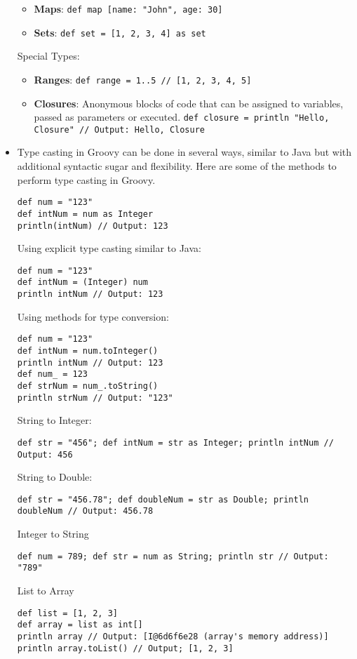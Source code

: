 \documentclass[letterpaper,11pt]{article}
\begin{document}
\begin{itemize}
\begin{itemize}
        \item \textbf{Maps}: \texttt{def map [name: "John", age: 30]}
        \item \textbf{Sets}: \texttt{def set = [1, 2, 3, 4] as set}
    \end{itemize}
Special Types:
    \begin{itemize}
        \item \textbf{Ranges}: \texttt{def range = 1..5 // [1, 2, 3, 4, 5]}
        \item \textbf{Closures}: Anonymous blocks of code that can be assigned to variables, passed as parameters or executed. \texttt{def closure = {println "Hello, Closure"} // Output: Hello, Closure}
    \end{itemize}

    \item Type casting in Groovy can be done in several ways, similar to Java but with additional syntactic sugar and flexibility. Here are some of the methods to perform type casting in Groovy.
    \begin{verbatim}
def num = "123"
def intNum = num as Integer
println(intNum) // Output: 123
    \end{verbatim}
Using explicit type casting similar to Java:
\begin{verbatim}
def num = "123"
def intNum = (Integer) num
println intNum // Output: 123
\end{verbatim}
Using methods for type conversion:
\begin{verbatim}
def num = "123"
def intNum = num.toInteger()
println intNum // Output: 123
def num_ = 123
def strNum = num_.toString()
println strNum // Output: "123"
\end{verbatim}
String to Integer:
\begin{verbatim}
def str = "456"; def intNum = str as Integer; println intNum // Output: 456
\end{verbatim}
String to Double:
\begin{verbatim}
def str = "456.78"; def doubleNum = str as Double; println doubleNum // Output: 456.78
\end{verbatim}
Integer to String
\begin{verbatim}
def num = 789; def str = num as String; println str // Output: "789"
\end{verbatim}
List to Array
\begin{verbatim}
def list = [1, 2, 3]
def array = list as int[]
println array // Output: [I@6d6f6e28 (array's memory address)]
println array.toList() // Output; [1, 2, 3]
\end{verbatim}



\end{itemize}
\end{document}
